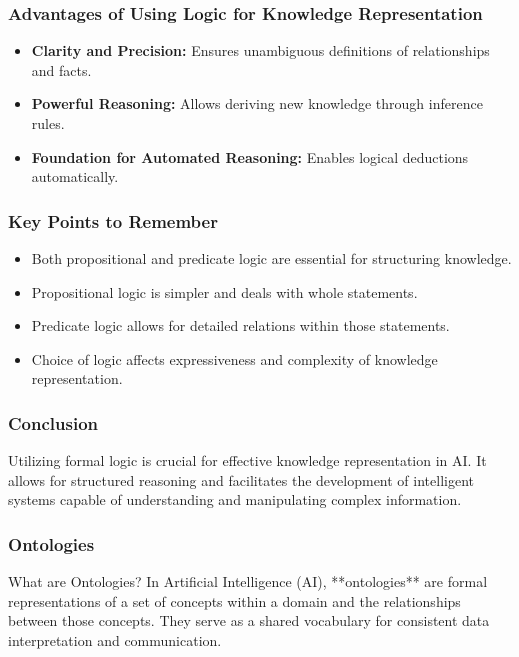 \documentclass[aspectratio=169]{beamer}
\begin{document}
\begin{frame}[fragile]
    \frametitle{Advantages of Using Logic for Knowledge Representation}
    \begin{itemize}
        \item \textbf{Clarity and Precision:} Ensures unambiguous definitions of relationships and facts.
        \item \textbf{Powerful Reasoning:} Allows deriving new knowledge through inference rules.
        \item \textbf{Foundation for Automated Reasoning:} Enables logical deductions automatically.
    \end{itemize}
\end{frame}

\begin{frame}[fragile]
    \frametitle{Key Points to Remember}
    \begin{itemize}
        \item Both propositional and predicate logic are essential for structuring knowledge.
        \item Propositional logic is simpler and deals with whole statements.
        \item Predicate logic allows for detailed relations within those statements.
        \item Choice of logic affects expressiveness and complexity of knowledge representation.
    \end{itemize}
\end{frame}

\begin{frame}[fragile]
    \frametitle{Conclusion}
    Utilizing formal logic is crucial for effective knowledge representation in AI. It allows for structured reasoning and facilitates the development of intelligent systems capable of understanding and manipulating complex information. 
\end{frame}

\begin{frame}[fragile]
    \frametitle{Ontologies}
    \begin{block}{What are Ontologies?}
        In Artificial Intelligence (AI), **ontologies** are formal representations of a set of concepts 
        within a domain and the relationships between those concepts. They serve as a shared vocabulary for 
        consistent data interpretation and communication.
    \end{block}
\end{frame}
\end{document}
